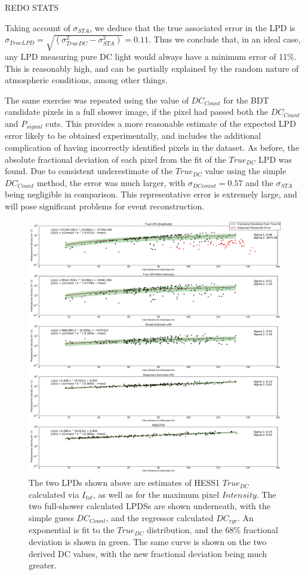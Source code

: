 \documentclass{article}
\begin{document}
REDO STATS

Taking account of $\sigma_{STA}$, we deduce that the true associated error in the LPD is $\sigma_{TrueLPD} = \sqrt{(\sigma_{TrueDC}^{2} - \sigma_{STA}^{2})} = 0.11$. Thus we conclude that, in an ideal case, any LPD measuring pure DC light would always have a minimum error of 11\%. This is reasonably high, and can be partially explained by the random nature of atmospheric conditions, among other things.

The same exercise was repeated using the value of $DC_{Count}$ for the BDT candidate pixels in a full shower image, if the pixel had passed both the $DC_{Count}$ and $P_{signal}$ cuts. This provides a more reasonable estimate of the expected LPD error likely to be obtained experimentally, and includes the additional complication of having incorrectly identified pixels in the dataset. As before, the absolute fractional deviation of each pixel from the fit of the $True_{DC}$ LPD was found. Due to consistent underestimate of the $True_{DC}$ value using the simple $DC_{Count}$ method, the error was much larger, with $\sigma_{DCcount}=0.57$ and the $\sigma_{STA}$ being negligible in comparison. This representative error is extremely large, and will pose significant problems for event reconstruction.

\begin{figure}
\begin{center}
\includegraphics[width=\textwidth]{corsikalpd1}
\caption{The two LPDs shown above are estimates of HESS1 $True_{DC}$ calculated via $I_{tot}$, as well as for the maximum pixel $Intensity$. The two full-shower calculated LPDSs are shown underneath, with the simple guess $DC_{Count}$, and the regressor calculated $DC_{rgr}$. An exponential is fit to the $True_{DC}$ distribution, and the 68\% fractional deviation is shown in green. The same curve is shown on the two derived DC values, with the new fractional deviation being much greater.}
\label{fig:corsikalpd1}
\end{center}
\end{figure}
\end{document}
